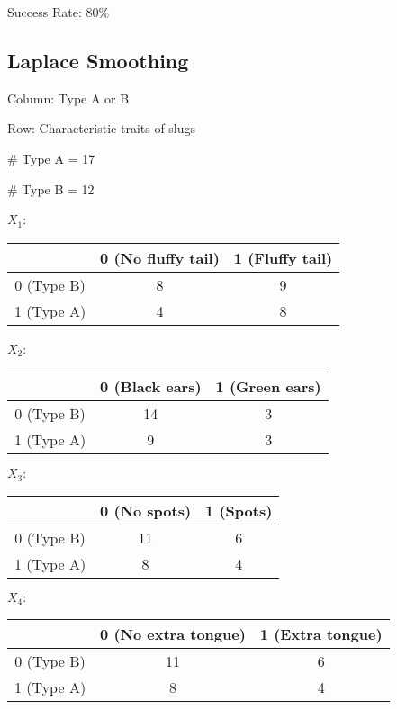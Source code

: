 \documentclass[12pt]{article}
\begin{document}
Success Rate: 80\%



\subsection{Laplace Smoothing}

Column: Type A or B

Row: Characteristic traits of slugs

\# Type A = 17

\# Type B = 12

$X_1$:

\begin{tabular}{c || c |c }
               & 0 (No fluffy tail) & 1 (Fluffy tail) \\
  \hline
  \hline
  0 (Type B)   & 8 & 9  \\
  \hline
  1 (Type A)   & 4 & 8 \\
\end{tabular}

$X_2$:

\begin{tabular}{c || c |c }
               & 0 (Black ears) & 1 (Green ears) \\
  \hline
  \hline
  0 (Type B)   & 14 & 3 \\
  \hline
  1 (Type A)   & 9  & 3 \\
\end{tabular}

$X_3:$

\begin{tabular}{c || c |c }
               & 0 (No spots) & 1 (Spots) \\
  \hline
  \hline
  0 (Type B)   & 11 & 6 \\
  \hline
  1 (Type A)   & 8 & 4  \\
\end{tabular}

$X_4:$

\begin{tabular}{c || c | c}
               & 0 (No extra tongue) & 1 (Extra tongue) \\
  \hline
  \hline
  0 (Type B)   & 11 & 6 \\
  \hline
  1 (Type A)   & 8 & 4 \\
\end{tabular}
\end{document}
